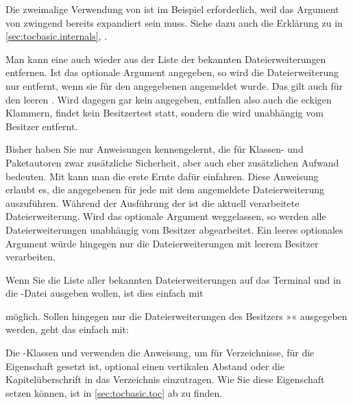 Die zweimalige Verwendung von  ist im
Beispiel erforderlich, weil das Argument von
 zwingend bereits expandiert
sein muss. Siehe dazu auch die Erklärung zu
 in
\autoref{sec:tocbasic.internals},
.
%
\EndIndexGroup


\begin{Declaration}
\end{Declaration}
Man kann eine  auch wieder aus der Liste der bekannten
Dateierweiterungen entfernen. Ist das optionale Argument 
angegeben, so wird die Dateierweiterung nur entfernt, wenn sie für den
angegebenen  angemeldet wurde. Das gilt auch für den leeren
. Wird dagegen gar kein  angegeben,
entfallen also auch die eckigen Klammern, findet kein Besitzertest statt,
sondern die  wird unabhängig vom Besitzer entfernt.%
\EndIndexGroup


\begin{Declaration}
\end{Declaration}
Bisher haben Sie nur Anweisungen kennengelernt, die für Klassen- und
Paketautoren zwar zusätzliche Sicherheit, aber auch eher zusätzlichen Aufwand
bedeuten. Mit  kann man die erste Ernte dafür
einfahren. Diese Anweisung erlaubt es, die angegebenen  für
jede mit dem  angemeldete Dateierweiterung
auszuführen. Während der Ausführung der  ist
 die aktuell
verarbeitete Dateierweiterung. Wird das optionale Argument
 weggelassen, so werden alle Dateierweiterungen
unabhängig vom Besitzer abgearbeitet. Ein leeres optionales Argument würde
hingegen nur die Dateierweiterungen mit leerem Besitzer verarbeiten.
\begin{Example}
  Wenn Sie die Liste aller bekannten Dateierweiterungen auf das Terminal und
  in die -Datei ausgeben wollen, ist dies einfach mit
\begin{lstcode}
  \doforeachtocfile{\typeout{\@currext}}
\end{lstcode}
  möglich. Sollen hingegen nur die Dateierweiterungen des Besitzers
  »« ausgegeben werden, geht das einfach mit:
\begin{lstcode}
  \doforeachtocfile[foo]{\typeout{\@currext}}
\end{lstcode}
\end{Example}
Die \KOMAScript-Klassen  und  verwenden die
Anweisung, um für Verzeichnisse, für die Eigenschaft 
gesetzt ist, optional einen vertikalen Abstand oder die Kapitelüberschrift in
das Verzeichnis einzutragen. Wie Sie diese Eigenschaft setzen können, ist
in \autoref{sec:tocbasic.toc} ab  zu
finden.%
\EndIndexGroup


